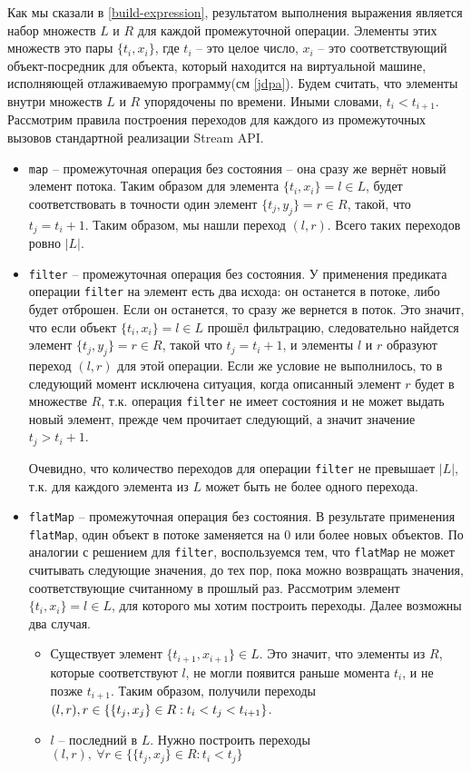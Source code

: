 Как мы сказали в \ref{build-expression}, результатом выполнения выражения является набор множеств $L$ и $R$ для каждой промежуточной операции. Элементы этих множеств это пары $\{t_i, x_i\}$, где $t_i$ -- это целое число, $x_i$ -- это соответствующий объект-посредник для объекта, который находится на виртуальной машине, исполняющей отлаживаемую программу(см \ref{jdpa}). Будем считать, что элементы внутри множеств $L$ и $R$ упорядочены по времени. Иными словами, $t_i < t_{i + 1}$. Рассмотрим правила построения переходов для каждого из промежуточных вызовов стандартной реализации Stream API.
\begin{itemize}
	\item \texttt{map} -- промежуточная операция без состояния -- она сразу же вернёт новый элемент потока. Таким образом для элемента $\{t_i, x_i\} = l \in L$, будет соответствовать в точности один элемент $\{t_j, y_j\} = r \in R$, такой, что $t_j = t_i + 1$. Таким образом, мы нашли переход $(l, r)$. Всего таких переходов ровно $|L|$.
	\item \texttt{filter} -- промежуточная операция без состояния. У применения предиката операции \texttt{filter} на элемент есть два исхода: он останется в потоке, либо будет отброшен. Если он останется, то сразу же вернется в поток. Это значит, что если объект $\{t_i, x_i\} = l \in L$ прошёл фильтрацию, следовательно найдется элемент $\{t_j, y_j\} = r \in R$, такой что $t_j = t_i + 1$, и элементы $l$ и $r$ образуют переход $(l, r)$ для этой операции. Если же условие не выполнилось, то в следующий момент исключена ситуация, когда описанный элемент $r$ будет в множестве $R$, т.к. операция \texttt{filter} не имеет состояния и не может выдать новый элемент, прежде чем прочитает следующий, а значит значение $t_j > t_i + 1$. 
	
	Очевидно, что количество переходов для операции \texttt{filter} не превышает $|L|$, т.к. для каждого элемента из $L$ может быть не более одного перехода.
	\item \texttt{flatMap} -- промежуточная операция без состояния. В результате применения \texttt{flatMap}, один объект в потоке заменяется на 0 или более новых объектов. По аналогии с решением для \texttt{filter}, воспользуемся тем, что \texttt{flatMap} не может считывать следующие значения, до тех пор, пока можно возвращать значения, соответствующие считанному в прошлый раз. Рассмотрим элемент $\{t_i, x_i\} = l \in L$, для которого мы хотим построить переходы. Далее возможны два случая.
	\begin{itemize}
		\item Существует элемент $\{t_{i + 1}, x_{i + 1}\} \in L$. Это значит, что элементы из $R$, которые соответствуют $l$, не могли появится раньше момента $t_i$, и не позже $t_{i + 1}$. Таким образом, получили переходы $(l, r), \\ r \in \{\{t_j, x_j\} \in R : t_i < t_j < t_{i + 1}\}$.
		\item $l $ -- последний в $L$. Нужно построить переходы $(l, r), \ \forall r \in \{\{t_j, x_j\} \in R : t_i < t_j\}$
	\end{itemize}


\end{itemize}
